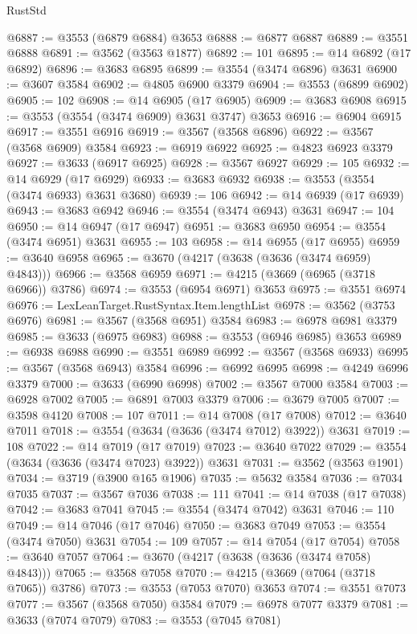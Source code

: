 \begin{lexlean}{RustStd}
\begin{coremodule}
@6887 := @3553 (@6879 @6884) @3653
@6888 := @6877 @6887
@6889 := @3551 @6888
@6891 := @3562 (@3563 @1877)
@6892 := 101
@6895 := @14 @6892 (@17 @6892)
@6896 := @3683 @6895
@6899 := @3554 (@3474 @6896) @3631
@6900 := @3607 @3584
@6902 := @4805 @6900 @3379
@6904 := @3553 (@6899 @6902)
@6905 := 102
@6908 := @14 @6905 (@17 @6905)
@6909 := @3683 @6908
@6915 := @3553 (@3554 (@3474 @6909) @3631 @3747) @3653
@6916 := @6904 @6915
@6917 := @3551 @6916
@6919 := @3567 (@3568 @6896)
@6922 := @3567 (@3568 @6909) @3584
@6923 := @6919 @6922
@6925 := @4823 @6923 @3379
@6927 := @3633 (@6917 @6925)
@6928 := @3567 @6927
@6929 := 105
@6932 := @14 @6929 (@17 @6929)
@6933 := @3683 @6932
@6938 := @3553 (@3554 (@3474 @6933) @3631 @3680)
@6939 := 106
@6942 := @14 @6939 (@17 @6939)
@6943 := @3683 @6942
@6946 := @3554 (@3474 @6943) @3631
@6947 := 104
@6950 := @14 @6947 (@17 @6947)
@6951 := @3683 @6950
@6954 := @3554 (@3474 @6951) @3631
@6955 := 103
@6958 := @14 @6955 (@17 @6955)
@6959 := @3640 @6958
@6965 := @3670 (@4217 (@3638 (@3636 (@3474 @6959) @4843)))
@6966 := @3568 @6959
@6971 := @4215 (@3669 (@6965 (@3718 @6966)) @3786)
@6974 := @3553 (@6954 @6971) @3653
@6975 := @3551 @6974
@6976 := LexLeanTarget.RustSyntax.Item.lengthList
@6978 := @3562 (@3753 @6976)
@6981 := @3567 (@3568 @6951) @3584
@6983 := @6978 @6981 @3379
@6985 := @3633 (@6975 @6983)
@6988 := @3553 (@6946 @6985) @3653
@6989 := @6938 @6988
@6990 := @3551 @6989
@6992 := @3567 (@3568 @6933)
@6995 := @3567 (@3568 @6943) @3584
@6996 := @6992 @6995
@6998 := @4249 @6996 @3379
@7000 := @3633 (@6990 @6998)
@7002 := @3567 @7000 @3584
@7003 := @6928 @7002
@7005 := @6891 @7003 @3379
@7006 := @3679 @7005
@7007 := @3598 @4120
@7008 := 107
@7011 := @14 @7008 (@17 @7008)
@7012 := @3640 @7011
@7018 := @3554 (@3634 (@3636 (@3474 @7012) @3922)) @3631
@7019 := 108
@7022 := @14 @7019 (@17 @7019)
@7023 := @3640 @7022
@7029 := @3554 (@3634 (@3636 (@3474 @7023) @3922)) @3631
@7031 := @3562 (@3563 @1901)
@7034 := @3719 (@3900 @165 @1906)
@7035 := @5632 @3584
@7036 := @7034 @7035
@7037 := @3567 @7036
@7038 := 111
@7041 := @14 @7038 (@17 @7038)
@7042 := @3683 @7041
@7045 := @3554 (@3474 @7042) @3631
@7046 := 110
@7049 := @14 @7046 (@17 @7046)
@7050 := @3683 @7049
@7053 := @3554 (@3474 @7050) @3631
@7054 := 109
@7057 := @14 @7054 (@17 @7054)
@7058 := @3640 @7057
@7064 := @3670 (@4217 (@3638 (@3636 (@3474 @7058) @4843)))
@7065 := @3568 @7058
@7070 := @4215 (@3669 (@7064 (@3718 @7065)) @3786)
@7073 := @3553 (@7053 @7070) @3653
@7074 := @3551 @7073
@7077 := @3567 (@3568 @7050) @3584
@7079 := @6978 @7077 @3379
@7081 := @3633 (@7074 @7079)
@7083 := @3553 (@7045 @7081)

\end{coremodule}
\end{lexlean}

